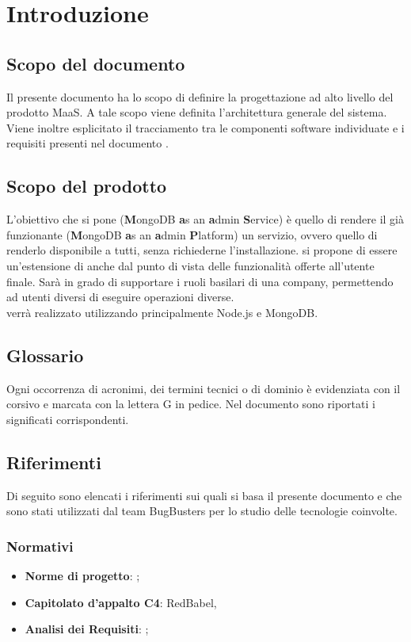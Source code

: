 \section{Introduzione}
\subsection{Scopo del documento}
Il presente documento ha lo scopo di definire la progettazione ad alto livello del prodotto MaaS. A tale scopo viene definita l'architettura generale del sistema. Viene inoltre esplicitato il tracciamento tra le componenti software individuate e i requisiti presenti nel documento \AnalisiDeiRequisiti. 

\subsection{Scopo del prodotto}
L'obiettivo che si pone  (\textbf{M}ongoDB \textbf{a}s an \textbf{a}dmin \textbf{S}ervice) è quello di rendere il già funzionante  (\textbf{M}ongoDB \textbf{a}s an \textbf{a}dmin \textbf{P}latform) un servizio, ovvero quello di renderlo disponibile a tutti, senza richiederne l'installazione.  si propone di essere un'estensione di  anche dal punto di vista delle funzionalità offerte all'utente finale. Sarà in grado di supportare i ruoli basilari di una company, permettendo ad utenti diversi di eseguire operazioni diverse. \\
 verrà realizzato utilizzando principalmente Node.js e MongoDB.

\subsection{Glossario}
Ogni occorrenza di acronimi, dei termini tecnici o di dominio è evidenziata con il corsivo e marcata con la lettera G in pedice. Nel documento \Glossario sono riportati i significati corrispondenti.

\subsection{Riferimenti}
Di seguito sono elencati i riferimenti sui quali si basa il presente documento e che sono stati utilizzati dal team BugBusters per lo studio delle tecnologie coinvolte.

\subsubsection{Normativi}
\begin{itemize}
\item \textbf{Norme di progetto}: \NormeDiProgetto;
\item \textbf{Capitolato d'appalto C4}: RedBabel,  
\item \textbf{Analisi dei Requisiti}: \AnalisiDeiRequisiti;
\end{itemize}
